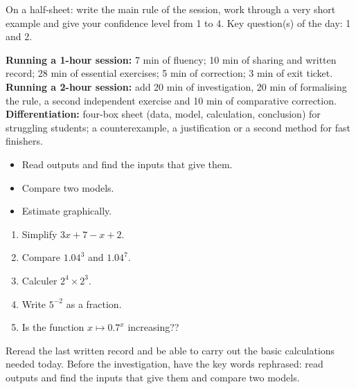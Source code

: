 \begin{sortie}On a half-sheet: write the main rule of the session, work through a very short example and give your confidence level from 1 to 4. Key question(s) of the day: 1 and 2.\end{sortie}

\ifprof
\vspace{-12mm}\begin{methode}\footnotesize
\textbf{Running a 1-hour session:} 7 min of fluency; 10 min of sharing and written record; 28 min of essential exercises; 5 min of correction; 3 min of exit ticket.\\
\textbf{Running a 2-hour session:} add 20 min of investigation, 20 min of formalising the rule, a second independent exercise and 10 min of comparative correction.\\
\textbf{Differentiation:} four-box sheet (data, model, calculation, conclusion) for struggling students; a counterexample, a justification or a second method for fast finishers.
\end{methode}
\fi
{}
\begin{objectifs}\begin{itemize}\item Read outputs and find the inputs that give them.\item Compare two models.\item Estimate graphically.\end{itemize}\end{objectifs}
\begin{automatismes}\begin{enumerate}\item Simplify $3x+7-x+2$. \item Compare $1.04^3$ and $1.04^7$. \item Calculer $2^4\times2^3$. \item Write $5^{-2}$ as a fraction. \item Is the function $x\mapsto0.7^x$ increasing?? \end{enumerate}\end{automatismes}
\begin{prerequis}Reread the last written record and be able to carry out the basic calculations needed today. Before the investigation, have the key words rephrased: read outputs and find the inputs that give them and compare two models.\end{prerequis}

